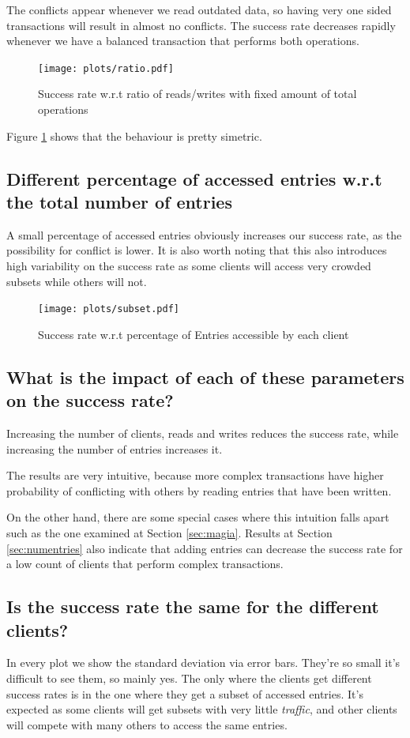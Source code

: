 \documentclass[a4paper, 10pt]{article}
\begin{document}
The conflicts appear whenever we read outdated data, so having very one sided transactions will result in almost no conflicts. The success rate decreases rapidly whenever we have a balanced transaction that performs both operations.

\begin{figure}[H]
  \centering
  \texttt{[image: plots/ratio.pdf]}
    \caption{Success rate w.r.t ratio of reads/writes with fixed amount of total operations}
    \label{fig:ratio}
\end{figure} 

Figure \ref{fig:ratio} shows that the behaviour is pretty simetric.

\clearpage

\subsection{Different percentage of accessed entries w.r.t the total number of entries}
\label{sec:nose}
A small percentage of accessed entries obviously increases our success rate, as the possibility for conflict is lower. It is also worth noting that this also introduces high variability on the success rate as some clients will access very crowded subsets while others will not.
\begin{figure}[H]
  \centering
  \texttt{[image: plots/subset.pdf]}
    \caption{Success rate w.r.t percentage of Entries accessible by each client}
    \label{fig:subset}
\end{figure} 


\subsection{What is the impact of each of these parameters on the success rate?}
Increasing the number of clients, reads and writes reduces the success rate, while increasing the number of entries increases it.

The results are very intuitive, because more complex transactions have higher probability of conflicting with others by reading entries that have been written.


On the other hand, there are some special cases where this intuition falls apart such as the one examined at Section \ref{sec:magia}. Results at Section \ref{sec:numentries} also indicate that adding entries can decrease the success rate for a low count of clients that perform complex transactions.


\subsection{Is the success rate the same for the different clients?}
In every plot we show the standard deviation via error bars. They're so small it's difficult to see them, so mainly yes. The only where the clients get different success rates is in the one where they get a subset of accessed entries. It's expected as some clients will get subsets with very little \textit{traffic}, and other clients will compete with many others to access the same entries.
\end{document}
